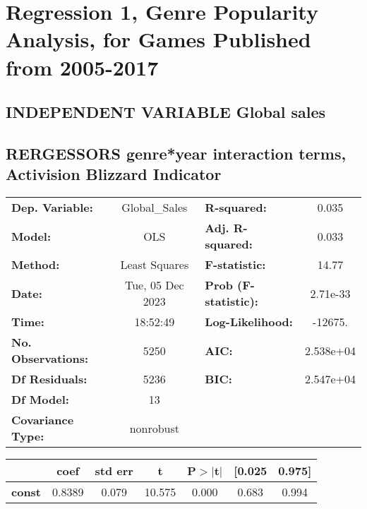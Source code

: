 \documentclass{report}
\begin{document}
\section*{Regression 1, Genre Popularity Analysis, for Games Published from 2005-2017}\bigskip
\subsection*{INDEPENDENT VARIABLE Global sales}\bigskip
\subsection*{RERGESSORS genre*year interaction terms, Activision Blizzard Indicator}\bigskip
\begin{center}
\begin{tabular}{lclc}
\toprule
\textbf{Dep. Variable:}            &  Global\_Sales   & \textbf{  R-squared:         } &      0.035    \\
\textbf{Model:}                    &       OLS        & \textbf{  Adj. R-squared:    } &      0.033    \\
\textbf{Method:}                   &  Least Squares   & \textbf{  F-statistic:       } &      14.77    \\
\textbf{Date:}                     & Tue, 05 Dec 2023 & \textbf{  Prob (F-statistic):} &   2.71e-33    \\
\textbf{Time:}                     &     18:52:49     & \textbf{  Log-Likelihood:    } &    -12675.    \\
\textbf{No. Observations:}         &        5250      & \textbf{  AIC:               } &  2.538e+04    \\
\textbf{Df Residuals:}             &        5236      & \textbf{  BIC:               } &  2.547e+04    \\
\textbf{Df Model:}                 &          13      & \textbf{                     } &               \\
\textbf{Covariance Type:}          &    nonrobust     & \textbf{                     } &               \\
\bottomrule
\end{tabular}
\begin{tabular}{lcccccc}
                                   & \textbf{coef} & \textbf{std err} & \textbf{t} & \textbf{P$> |$t$|$} & \textbf{[0.025} & \textbf{0.975]}  \\
\midrule
\textbf{const}                     &       0.8389  &        0.079     &    10.575  &         0.000        &        0.683    &        0.994     \\

\end{tabular}
\end{center}
\end{document}
